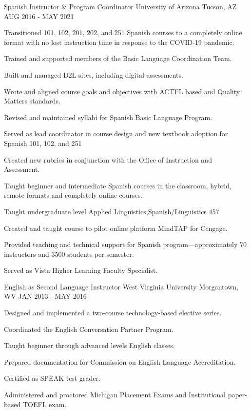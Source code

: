 \begin{cventries}

\cventry
{Spanish Instructor \& Program Coordinator} %
{University of Arizona} %
{Tucson, AZ} %
{AUG 2016 - MAY 2021} %
{ %
\begin{cvitems}
\item {Transitioned 101, 102, 201, 202, and 251 Spanish courses to a completely online format with no lost instruction time in response to the COVID-19 pandemic.}
\item {Trained and supported members of the Basic Language Coordination Team.}
\item {Built and managed D2L sites, including digital assessments.}
\item {Wrote and aligned course goals and objectives with ACTFL based and Quality Matters standards.}
\item {Revised and maintained syllabi for Spanish Basic Language Program.}
\item {Served as lead coordinator in course design and new textbook adoption for Spanish 101, 102, and 251}
\item {Created new rubrics in conjunction with the Office of Instruction and Assessment.}
\item {Taught beginner and intermediate Spanish courses in the classroom, hybrid, remote formats and completely online courses.}
\item {Taught undergraduate level Applied Linguistics,Spanish/Linguistics 457} 
\item {Created and taught course to pilot online platform MindTAP for Cengage.}
\item {Provided teaching and technical support for Spanish program---approximately 70 instructors and 3500 students per semester.}
\item {Served as Vista Higher Learning Faculty Specialist.}
\end{cvitems}
}


\cventry
{English as Second Language Instructor} %
{West Virginia University} %
{Morgantown, WV} %
{JAN 2013 - MAY 2016} %
{ %
\begin{cvitems}
\item {Designed and implemented a two-course technology-based elective series.}
\item {Coordinated the English Conversation Partner Program.}
\item {Taught beginner through advanced levels English classes.}
\item {Prepared documentation for Commission on English Language Accreditation.}
\item {Certified as SPEAK test grader.}
\item {Administered and proctored Michigan Placement Exams and Institutional paper-based TOEFL exam.}
\end{cvitems}
}


\end{cventries}
